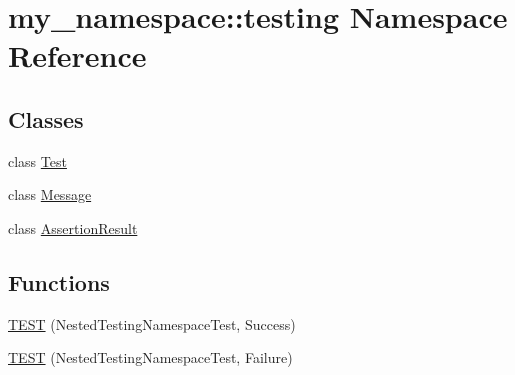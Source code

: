 \hypertarget{namespacemy__namespace_1_1testing}{\section{my\-\_\-namespace\-:\-:testing Namespace Reference}
\label{namespacemy__namespace_1_1testing}
}
\subsection*{Classes}
\begin{DoxyCompactItemize}
\item 
class \hyperlink{classmy__namespace_1_1testing_1_1_test}{Test}
\item 
class \hyperlink{classmy__namespace_1_1testing_1_1_message}{Message}
\item 
class \hyperlink{classmy__namespace_1_1testing_1_1_assertion_result}{Assertion\-Result}
\end{DoxyCompactItemize}
\subsection*{Functions}
\begin{DoxyCompactItemize}
\item 
\hyperlink{namespacemy__namespace_1_1testing_ad673a1b79baca8e8c493774b2a4b0127}{T\-E\-S\-T} (Nested\-Testing\-Namespace\-Test, Success)
\item 
\hyperlink{namespacemy__namespace_1_1testing_aa568f6a68b9e42841f6da570ef62b623}{T\-E\-S\-T} (Nested\-Testing\-Namespace\-Test, Failure)
\end{DoxyCompactItemize}


